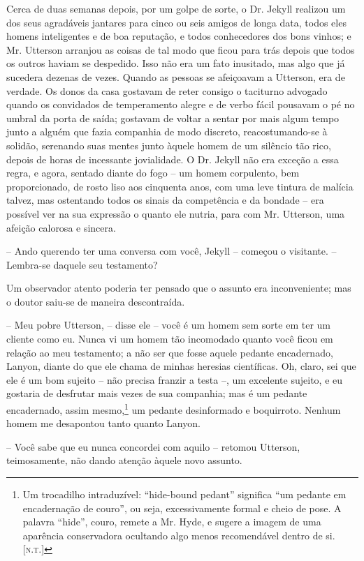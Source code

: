 Cerca de duas semanas depois, por um golpe de sorte, o Dr. Jekyll
realizou um dos seus agradáveis jantares para cinco ou seis amigos de
longa data, todos eles homens inteligentes e de boa reputação, e todos
conhecedores dos bons vinhos; e Mr. Utterson arranjou as coisas de tal
modo que ficou para trás depois que todos os outros haviam se
despedido.  Isso não era um fato inusitado, mas algo que já sucedera
dezenas de vezes.  Quando as pessoas se afeiçoavam a Utterson, era de
verdade.  Os donos da casa gostavam de reter consigo o taciturno
advogado quando os convidados de temperamento alegre e de verbo
fácil pousavam o pé no umbral da porta de saída; gostavam de voltar a
sentar por mais algum tempo junto a alguém que fazia companhia de modo
discreto, reacostumando-se à solidão, serenando suas mentes junto
àquele homem de um silêncio tão rico, depois de horas de incessante
jovialidade.  O Dr. Jekyll não era exceção a essa regra, e agora,
sentado diante do fogo -- um homem corpulento, bem proporcionado, de
rosto liso aos cinquenta anos, com uma leve tintura de malícia talvez,
mas ostentando todos os sinais da competência e da bondade -- era
possível ver na sua expressão o quanto ele nutria, para com Mr.
Utterson, uma afeição calorosa e sincera.

-- Ando querendo ter uma conversa com você, Jekyll -- começou o
visitante. -- Lembra-se daquele seu testamento? 

Um observador atento poderia ter pensado que o assunto era
inconveniente; mas o doutor saiu-se de maneira descontraída.

-- Meu pobre Utterson, -- disse ele -- você é um homem sem sorte em ter um
cliente como eu.  Nunca vi um homem tão incomodado quanto você ficou em
relação ao meu testamento; a não ser que fosse aquele pedante
encadernado, Lanyon, diante do que ele chama de minhas heresias
científicas.  Oh, claro, sei que ele é um bom sujeito -- não precisa
franzir a testa --, um excelente sujeito, e eu gostaria de desfrutar mais
vezes de sua companhia; mas é um pedante encadernado, assim mesmo,\footnote{
Um trocadilho intraduzível: “hide-bound pedant” significa “um pedante em
encadernação de couro”, ou seja, excessivamente formal e cheio de pose.
A palavra “hide”, couro, remete a Mr. Hyde, e sugere a imagem de uma
aparência conservadora ocultando algo menos recomendável dentro de si. [\textsc{n.t.}]}
um pedante desinformado e boquirroto.  Nenhum homem
me desapontou tanto quanto Lanyon.

-- Você sabe que eu nunca concordei com aquilo -- retomou Utterson,
teimosamente, não dando atenção àquele novo assunto. 


